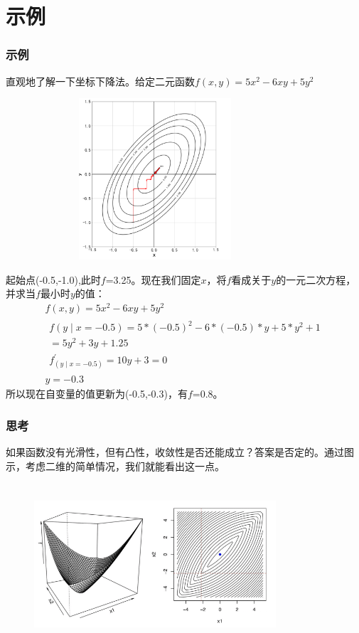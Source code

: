 \documentclass[10pt]{beamer}
\begin{document}

\section{示例}
\begin{frame}
	\frametitle{示例}
	直观地了解一下坐标下降法。给定二元函数$f(x, y)=5 x^{2}-6 x y+5 y^{2}$
	\begin{figure}
		\centering
		\includegraphics[height=6cm,width=9cm]{picture/00.png}
	\end{figure}
\end{frame}

\begin{frame}
	起始点(-0.5,-1.0),此时$f$=3.25。现在我们固定$x$，将$f$看成关于$y$的一元二次方程，并求当$f$最小时$y$的值：
	$$
	\begin{array}{l}
	f(x, y)=5 x^{2}-6 x y+5 y^{2}\\
	\begin{array}{l}
	f(y \mid x=-0.5)=5 *(-0.5)^{2}-6 *(-0.5) * y+5 * y^{2}+1 \\
	=5 y^{2}+3 y+1.25 \\
	f_{(y \mid x=-0.5)}^{\prime}=10 y+3=0
	\end{array}\\
	y=-0.3
	\end{array}
	$$
	所以现在自变量的值更新为(-0.5,-0.3)，有$f$=0.8。
\end{frame}

\begin{frame}
	\frametitle{思考}

如果函数没有光滑性，但有凸性，收敛性是否还能成立？答案是否定的。通过图示，考虑二维的简单情况，我们就能看出这一点。
	\begin{figure}
	\centering
	\includegraphics[height=6cm,width=9cm]{picture/01.png}
    \end{figure}
\end{frame}
\end{document}
